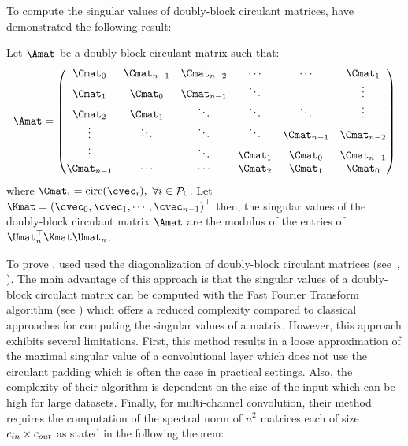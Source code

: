 To compute the singular values of doubly-block circulant matrices, \citet{sedghi2018singular} have demonstrated the following result:
\begin{theorem} \label{theorem:ch3-singular_values_doubly_block_circulant}
  Let $\Amat$ be a doubly-block circulant matrix such that:
  \begin{equation*}
    \Amat = \leftmatrix
      \Cmat_0     & \Cmat_{n-1} & \Cmat_{n-2} & \cdots  & \cdots      & \Cmat_1     \\
      \Cmat_1     & \Cmat_0     & \Cmat_{n-1} & \ddots  &             & \vdots      \\
      \Cmat_2     & \Cmat_1     & \ddots      & \ddots  & \ddots      & \vdots      \\
      \vdots      & \ddots      & \ddots      & \ddots  & \Cmat_{n-1} & \Cmat_{n-2} \\
      \vdots      &             & \ddots      & \Cmat_1 & \Cmat_{0}   & \Cmat_{n-1} \\
      \Cmat_{n-1} & \cdots      & \cdots      & \Cmat_2 & \Cmat_{1}   & \Cmat_0
    \rightmatrix
  \end{equation*}
  where $\Cmat_i = \circulant({\cvec_i}),\ \forall i \in \mathcal{P}_0$.
  Let $\Kmat = \leftmat \cvec_0, \cvec_1, \cdots, \cvec_{n-1} \rightmat^\top$ then, the singular values of the doubly-block circulant matrix $\Amat$ are the modulus of the entries of $\Umat_n^\top \Kmat \Umat_n$.
\end{theorem}

\noindent
To prove , \citet{sedghi2018singular} used used the diagonalization of doubly-block circulant matrices (see~, ).
The main advantage of this approach is that the singular values of a doubly-block circulant matrix can be computed with the Fast Fourier Transform algorithm (see ) which offers a reduced complexity compared to classical approaches for computing the singular values of a matrix.
However, this approach exhibits several limitations.
First, this method results in a loose approximation of the maximal singular value of a convolutional layer which does not use the circulant padding which is often the case in practical settings.
Also, the complexity of their algorithm is dependent on the size of the input which can be high for large datasets.
Finally, for multi-channel convolution, their method requires the computation of the spectral norm of $n^2$ matrices each of size $c_{in} \times c_{out}$ as stated in the following theorem:

